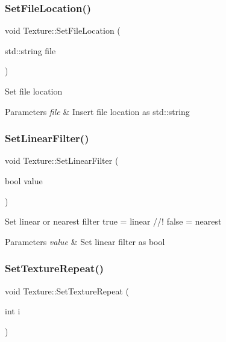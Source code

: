 \subsubsection{\texorpdfstring{SetFileLocation()}{SetFileLocation()}}
{\footnotesize\ttfamily void Texture\+::\+Set\+File\+Location (\begin{DoxyParamCaption}\item[{std\+::string}]{file }\end{DoxyParamCaption})}

Set file location 
\begin{DoxyParams}{Parameters}
{\em file} & Insert file location as std\+::string \\
\hline
\end{DoxyParams}
\mbox{\label{class_texture_a9a63163e104361b8ef653e5b28c9cf80}} 
\subsubsection{\texorpdfstring{SetLinearFilter()}{SetLinearFilter()}}
{\footnotesize\ttfamily void Texture\+::\+Set\+Linear\+Filter (\begin{DoxyParamCaption}\item[{bool}]{value }\end{DoxyParamCaption})}

Set linear or nearest filter true = linear //! false = nearest 
\begin{DoxyParams}{Parameters}
{\em value} & Set linear filter as bool \\
\hline
\end{DoxyParams}
\mbox{\label{class_texture_ab6b96af013775496d5745a24175dd624}} 
\subsubsection{\texorpdfstring{SetTextureRepeat()}{SetTextureRepeat()}}
{\footnotesize\ttfamily void Texture\+::\+Set\+Texture\+Repeat (\begin{DoxyParamCaption}\item[{int}]{i }\end{DoxyParamCaption})}

